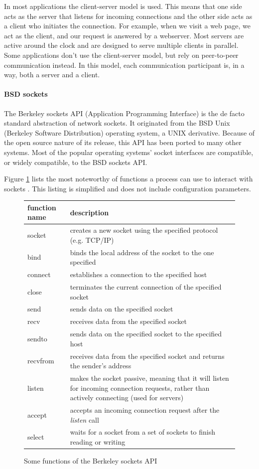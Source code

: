 \documentclass[11pt,twoside,abstract,notitlepage]{scrreprt}
\begin{document}
In most applications the client-server model is used. This means that one side acts as the server that listens for incoming connections and the other side acts as a client who initiates the connection. For example, when we visit a web page, we act as the client, and our request is answered by a webserver. Most servers are active around the clock and are designed to serve multiple clients in parallel. Some applications don't use the client-server model, but rely on peer-to-peer communication instead. In this model, each communication participant is, in a way, both a server and a client.

\paragraph{BSD sockets} The Berkeley sockets API (Application Programming Interface) is the de facto standard abstraction of network sockets. It originated from the BSD Unix (Berkeley Software Distribution) operating system, a UNIX derivative. Because of the open source nature of its release, this API has been ported to many other systems. Most of the popular operating systems' socket interfaces are compatible, or widely compatible, to the BSD sockets API. 

Figure \ref{fig:berkeleysockets} lists the most noteworthy of functions a process can use to interact with sockets \cite[p. 445]{stevens95}. This listing is simplified and does not include configuration parameters. 

\begin{figure}
\caption{Some functions of the Berkeley sockets API}
\label{fig:berkeleysockets}
\renewcommand{\arraystretch}{1.2}
\begin{tabularx}{\textwidth}{l|X}
\textbf{function name} & \textbf{description} \\ \hline
socket & creates a new socket using the specified protocol (e.g. TCP/IP) \\ \hline
bind & binds the local address of the socket to the one specified \\ \hline
connect & establishes a connection to the specified host  \\ \hline
close & terminates the current connection of the specified socket \\ \hline
send & sends data on the specified socket \\ \hline
recv & receives data from the specified socket \\ \hline
sendto & sends data on the specified socket to the specified host \\ \hline
recvfrom & receives data from the specified socket and returns the sender's address \\ \hline
listen & makes the socket passive, meaning that it will listen for incoming connection requests, rather than actively connecting (used for servers)\\ \hline
accept & accepts an incoming connection request after the \emph{listen} call\\ \hline
select & waits for a socket from a set of sockets to finish reading or writing\\ 
\end{tabularx}
\end{figure}
\end{document}
